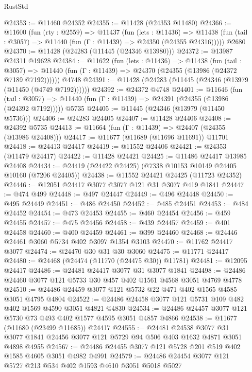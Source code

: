 \begin{lexlean}{RustStd}
\begin{coremodule}
@24353 := @11460 @24352
@24355 := @11428 (@24353 @11480)
@24366 := @11600
    (fun (rty : @2559) =>
    @11437
      (fun (lets : @11436) =>
      @11438 (fun (tail : @3057) => @11440 (fun (Γ : @11439) => @24350 (@24355 @24316)))))
    @2680
@24370 := @11428 (@24283 (@11445 (@24346 @13980)))
@24372 := @13987 @24311 @19628
@24384 := @11622
    (fun (lets : @11436) =>
    @11438
      (fun (tail : @3057) =>
      @11440 (fun (Γ : @11439) => @24370 (@24355 (@13986 (@24372 @7189 @7192))))))
    @4748
@24391 := @11428 (@24283 (@11445 (@24346 (@13979 (@11450 (@4749 @7192))))))
@24392 := @24372 @4748
@24401 := @11646
    (fun (tail : @3057) => @11440 (fun (Γ : @11439) => @24391 (@24355 (@13986 (@24392 @7192)))))
    @5735
@24405 := @11445 (@24346 (@13979 (@11450 @5736)))
@24406 := @24283 @24405
@24407 := @11428 @24406
@24408 := @24392 @5735
@24413 := @11664 (fun (Γ : @11439) => @24407 (@24355 (@13986 @24408)))
@24417 := @11677 (@11689 (@11696 @11691)) @11701
@24418 := @24413 @24417
@24419 := @11552 @24406
@24421 := @24353 (@11479 @24417)
@24422 := @11428 @24421
@24425 := @11486 @24417 @13985 @24408
@24434 := @24419 (@24422 @24425) (@7338 @10153 @10149 @24405 @10160 (@7206 @24405))
@24438 := @11552 @24421 @24425 (@11723 @24352)
@24446 := @12051 @24417 @3077 @3077 @121 @31 @3077 @419 @1841
@24447 := @474 @499
@24448 := @497 @24447
@24449 := @496 @24448
@24450 := @495 @24449
@24451 := @486 @24450
@24452 := @485 @24451
@24453 := @484 @24452
@24454 := @473 @24453
@24455 := @460 @24454
@24456 := @459 @24455
@24457 := @475 @24456
@24458 := @439 @24457
@24459 := @401 @24458
@24460 := @400 @24459
@24461 := @399 @24460
@24468 := @24446 @24461 @3060 @5734 @402 @3097 @1354 @3103
@24470 := @11762 @24417 @3077
@24474 := @24470 @30 @31 @30 @3060
@24475 := @11771 @24417
@24480 := @24468 (@24474 (@11770 (@24475 @30)) @11781)
@24481 := @12095 @24417
@24486 := @24481 @24417 @3077 @31 @3077 @1841
@24498 := @24486 @24460 @3077 @121 @5733 @30 @457 @402 @1561 @4568 @3051 @4769 @4778
@24510 := @24486 @24459 @3077 @121 @5732 @22 @471 @402 @1565 @4585 @3051 @4795 @4804
@24522 := @24486 @24458 @3077 @121 @5731 @109 @482 @402 @1569 @4590 @3051 @4821 @4830
@24534 := @24486 @24457 @3077 @121 @5730 @73 @493 @402 @1577 @4595 @3051 @4857 @4866
@24538 := @11677 (@11680 (@23499 @11685)) @24417
@24555 := @24481
    @24538
    @3077
    @31
    @3077
    @1841
    @24456
    @3077
    @121
    @5729
    @94
    @506
    @403
    @1632
    @4871
    @3051
    @4898
    @4955
@24567 := @24486 @24455 @3077 @121 @5728 @201 @519 @402 @1585 @4605 @3051 @4982 @4991
@24579 := @24486 @24454 @3077 @121 @5727 @213 @534 @402 @1593 @4610 @3051 @5018 @5027

\end{coremodule}
\end{lexlean}

